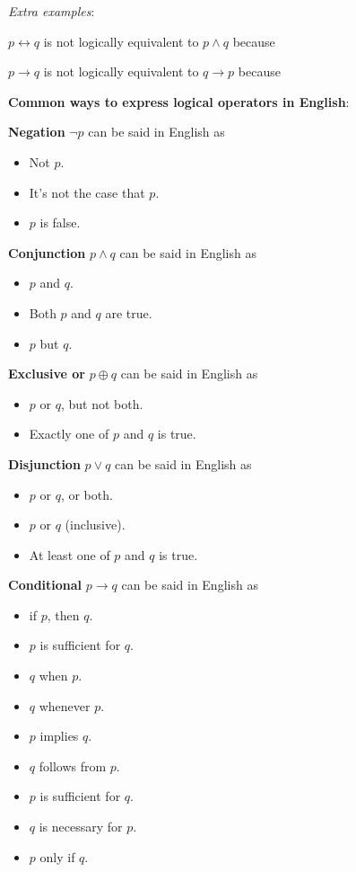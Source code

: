 \documentclass[12pt, oneside]{article}
\begin{document}
{\it Extra examples}:

$p \leftrightarrow q$ is not logically equivalent to $p \land q$ because \underline{\phantom{\hspace{4in}}} 

$p \to q$ is not logically equivalent to $q \to p$ because \underline{\phantom{\hspace{4in}}} 
 \newpage


{\bf Common ways to express logical operators in English}:

{\bf Negation} $\lnot p$ can be said in English as 
\begin{itemize}
\item Not $p$.
\item It's not the case that $p$.
\item $p$ is false.
\end{itemize}

{\bf Conjunction} $p \land q$ can be said in English as
\begin{itemize}
    \item $p$ and $q$.
    \item Both $p$ and $q$ are true.
    \item $p$ but $q$.
\end{itemize}

{\bf Exclusive or} $p \oplus q$ can be said in English as
\begin{itemize}
    \item $p$ or $q$, but not both.
    \item Exactly one of $p$ and $q$ is true.
\end{itemize}

{\bf Disjunction} $p \lor q$ can be said in English as
\begin{itemize}
    \item $p$ or $q$, or both.
    \item $p$ or $q$ (inclusive).
    \item At least one of $p$ and $q$ is true.
\end{itemize}

{\bf Conditional} $p \to q$ can be said in English as
\begin{multicols}{2}
\begin{itemize}
    \item if $p$, then $q$.
    \item $p$ is sufficient for $q$.
    \item $q$ when $p$.
    \item $q$ whenever $p$.
    \item $p$ implies $q$.
    \item $q$ follows from $p$.
    \item $p$ is sufficient for $q$.
    \item $q$ is necessary for $p$.
    \item $p$ only if $q$.
\end{itemize}
\end{multicols}
\end{document}

